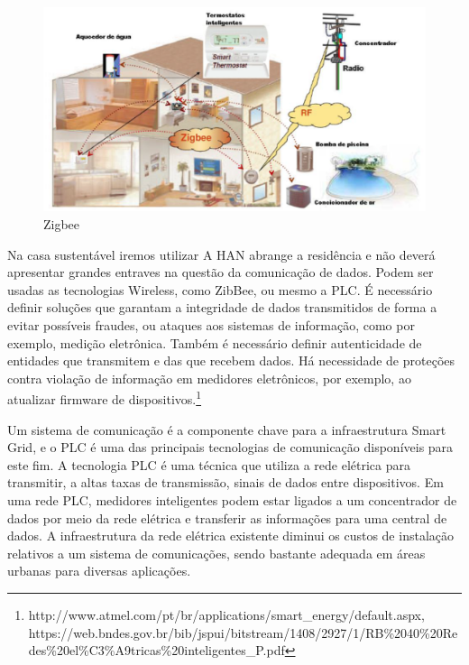 \begin{figure}[H]
  \begin{center}
	\includegraphics[keepaspectratio]{figuras/zigbee.eps}
	\caption{Zigbee}
  \end{center}
\end{figure}

	Na casa sustentável iremos utilizar A HAN abrange a residência e não deverá apresentar grandes entraves na questão da comunicação de dados. Podem ser usadas as tecnologias Wireless, como ZibBee, ou mesmo a PLC. É necessário definir soluções que garantam a integridade de dados transmitidos de forma a evitar possíveis fraudes, ou ataques aos sistemas de informação, como por exemplo, medição eletrônica. Também é necessário definir autenticidade de entidades que transmitem e das que recebem dados. Há necessidade de proteções contra violação de informação em medidores eletrônicos, por exemplo, ao atualizar firmware de dispositivos.\footnote{http://www.atmel.com/pt/br/applications/smart\_energy/default.aspx, https://web.bndes.gov.br/bib/jspui/bitstream/1408/2927/1/RB\%2040\%20Redes\%20el\%C3\%A9tricas\%20inteligentes\_P.pdf}

	Um sistema de comunicação é a componente chave para a infraestrutura Smart Grid, e o PLC é uma das principais tecnologias de comunicação disponíveis para este fim. A tecnologia PLC é uma técnica que utiliza a rede elétrica para transmitir, a altas taxas de transmissão, sinais de dados entre dispositivos. Em uma rede PLC, medidores inteligentes podem estar ligados a um concentrador de dados por meio da rede elétrica e transferir as informações para uma central de dados. A infraestrutura da rede elétrica existente diminui os custos de instalação relativos a um sistema de comunicações, sendo bastante adequada em áreas urbanas para diversas aplicações.

